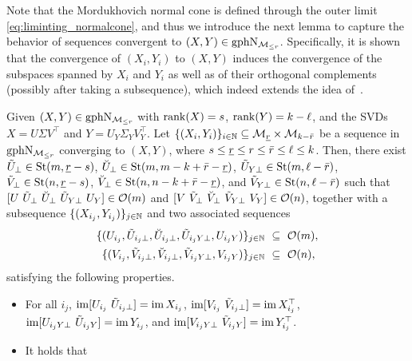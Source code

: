 Note that the Mordukhovich normal cone is defined through the outer limit \eqref{eq:liminting_normalcone}, and thus we introduce the next lemma to capture the behavior of sequences convergent to $(X,Y)\in\mathrm{gph}\mathrm{N}_{\mathcal{M}_{\le r}}$. Specifically, it is shown that the convergence of ${(X_i,Y_i)}$ to $(X,Y)$ induces the convergence of the subspaces spanned by $X_i$ and $Y_i$ as well as of their orthogonal complements (possibly after taking a subsequence), which indeed extends the idea of~\cite[Lemma 4.2]{olikier2022continuity}.

\begin{lemma}\label{lem:fivepart_convergence}
 Given $(X,Y)\in\mathrm{gph}\mathrm{N}_{\mathcal{M}_{\le r}}$ with $\operatorname{rank}(X)=s$, $\operatorname{rank}(Y)=k-\ell$, and the SVDs $X=U\varSigma V^\top$ and $Y=U_Y\varSigma_YV_Y^\top$. Let $\{(X_i,Y_i)\}_{i\in\mathbb{N}}\subseteq\mathcal{M}_{{\underline{r}}}\times\mathcal{M}_{k-\bar{r}} $ be a sequence in $\mathrm{gph}\mathrm{N}_{\mathcal{M}_{\le r}}$ converging to $(X,Y)$, where $s\le {\underline{r}}\le r\le \bar{r}\le\ell\le k$. Then, there exist $\tilde{U}_\bot\in\mathrm{St}(m,{\underline{r}}-s)$, $\breve{U}_\bot\in\mathrm{St}(m,m-k+\bar{r}-{\underline{r}})$, $\tilde{U}_{Y\bot}\in\mathrm{St}(m,\ell-\bar{r})$, $\tilde{V}_\bot\in\mathrm{St}(n,{\underline{r}}-s)$, $\breve{V}_\bot\in\mathrm{St}(n,n-k+\bar{r}-{\underline{r}})$, and $\tilde{V}_{Y\bot}\in\mathrm{St}(n,\ell-\bar{r})$ such that $[U\ \tilde{U}_\bot\ \breve{U}_\bot\ \tilde{U}_{Y\bot}\  U_Y]\in\orth(m)$ and $[V\ \tilde{V}_\bot\ \breve{V}_\bot\ \tilde{V}_{Y\bot}\ V_Y]\in\orth(n)$, together with a subsequence $\{(X_{i_j},Y_{i_j})\}_{j\in\mathbb{N}}$ and two associated sequences
    \begin{equation*}\label{eq:U_V_spacesequence}
        \begin{aligned}
            \{(U_{i_j},\tilde{U}_{i_j\bot},\breve{U}_{i_j\bot},\tilde{U}_{i_jY\bot},U_{i_j Y})\}_{j\in\mathbb{N}} \ &\subseteq\ \mathcal{O}(m),
            \\
            \{(V_{i_j},\tilde{V}_{i_j\bot},\breve{V}_{i_j\bot},\tilde{V}_{i_jY\bot},V_{i_j Y})\}_{j\in\mathbb{N}} \ &\subseteq\ \mathcal{O}(n),
        \end{aligned}
    \end{equation*}
    satisfying the following properties.
    \begin{itemize}[left=0cm]
    \item For all $i_j$, $\operatorname{im}[U_{i_j}\ \tilde{U}_{i_j\bot}]=\operatorname{im} X_{i_j}$, $\ima[V_{i_j}\ \tilde{V}_{i_j\bot}]=\ima X^\top_{i_j}$, $\operatorname{im}[U_{i_j Y\bot}\ \tilde{U}_{i_j Y}]=\operatorname{im} Y_{i_j}$, and $\ima[V_{i_j Y\bot}\ \tilde{V}_{i_j Y}]=\ima Y^\top_{i_j}$.
    \item It holds that 

\end{itemize}
\end{lemma}
